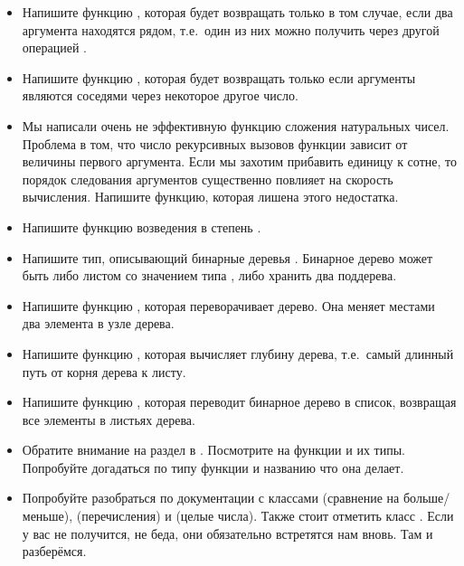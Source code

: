 \begin{itemize}

\item Напишите функцию , которая
        будет возвращать  только в том случае, если
        два аргумента находятся рядом, т.е.~один из них можно
        получить через другой операцией .

\item Напишите функцию , которая
        будет возвращать  только если аргументы
        являются соседями через некоторое другое число. 

\item Мы написали очень не эффективную функцию сложения 
натуральных чисел. Проблема в том, что число рекурсивных вызовов
функции зависит от величины первого аргумента. Если мы захотим прибавить
единицу к сотне, то порядок следования аргументов существенно
повлияет на скорость вычисления. Напишите функцию, которая
лишена этого недостатка.

\item Напишите функцию возведения в степень .

\item Напишите тип, описывающий бинарные деревья . 
        Бинарное дерево может быть либо листом со значением типа ,
        либо хранить два поддерева.

\item Напишите функцию ,
        которая переворачивает дерево. Она меняет местами два элемента
        в узле дерева.

\item Напишите функцию , которая
        вычисляет глубину дерева, т.е.~самый длинный путь от корня дерева
        к листу.

\item Напишите функцию , которая
        переводит бинарное дерево в список, возвращая все элементы
        в листьях дерева.  

\item Обратите внимание на раздел  в . 
        Посмотрите на функции и их типы. Попробуйте догадаться
        по типу функции и названию что она делает.

\item Попробуйте разобраться по документации с классами 
        (сравнение на больше/меньше),  (перечисления) и 
         (целые числа). Также стоит отметить
        класс .
        Если у вас не получится, не беда, они обязательно
        встретятся нам вновь. Там и разберёмся.
                

\end{itemize}
